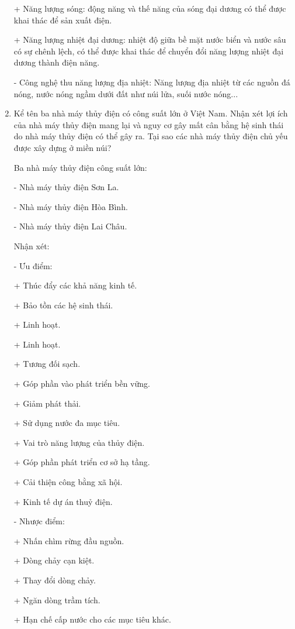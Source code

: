 \begin{enumerate}[label=\bfseries Câu \arabic*:]
{		+ Năng lượng sóng: động năng và thế năng của sóng đại dương có thể được khai thác để sản xuất điện.
		
		+ Năng lượng nhiệt đại dương: nhiệt độ giữa bề mặt nước biển và nước sâu có sự chênh lệch, có thể được khai thác để chuyển đổi năng lượng nhiệt đại dương thành điện năng.
		
		- Công nghệ thu năng lượng địa nhiệt: Năng lượng địa nhiệt từ các nguồn đá nóng, nước nóng ngầm dưới đất như núi lửa, suối nước nóng...
	}
	\item {}
	
	
	{
		Kể tên ba nhà máy thủy điện có công suất lớn ở Việt Nam. Nhận xét lợi ích của nhà máy thủy điện mang lại và nguy cơ gây mất cân bằng hệ sinh thái do nhà máy thủy điện có thể gây ra. Tại sao các nhà máy thủy điện chủ yếu được xây dựng ở miền núi?
	}
	
	\hideall
	{
		Ba nhà máy thủy điện công suất lớn: 
		
		- Nhà máy thủy điện Sơn La.
		
		- Nhà máy thủy điện Hòa Bình.
		
		- Nhà máy thủy điện Lai Châu.
		
		Nhận xét: 
		
		- Ưu điểm:
		
		+ Thúc đẩy các khả năng kinh tế.
		
		+ Bảo tồn các hệ sinh thái.
		
		+ Linh hoạt.
		
		+ Linh hoạt.
		
		+ Tương đối sạch.
		
		+ Góp phần vào phát triển bền vững.
		
		+ Giảm phát thải.
		
		+ Sử dụng nước đa mục tiêu.
		
		+ Vai trò năng lượng của thủy điện.
		
		+ Góp phần phát triển cơ sở hạ tầng.
		
		+ Cải thiện công bằng xã hội.
		
		+ Kinh tế dự án thuỷ điện.
		
		- Nhược điểm: 
		
		+ Nhấn chìm rừng đầu nguồn.
		
		+ Dòng chảy cạn kiệt.
		
		+ Thay đổi dòng chảy.
		
		+ Ngăn dòng trầm tích.
		
		+ Hạn chế cấp nước cho các mục tiêu khác.
		
}
\end{enumerate}

